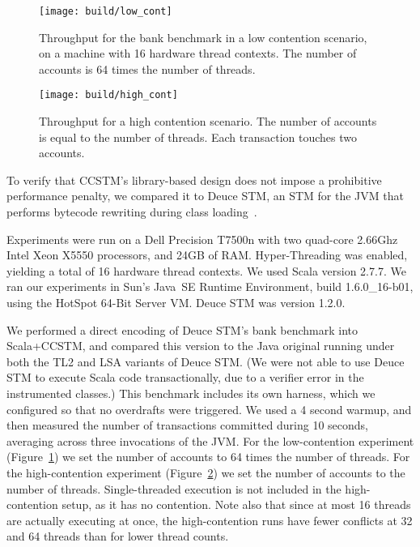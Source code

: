 
\begin{figure}
  \centering \texttt{[image: build/low\_cont]}

\caption{Throughput for the bank benchmark in a low contention scenario,
on a machine with 16 hardware thread contexts.  The number of accounts
is 64 times the number of threads.}

  \label{fig:lowcont}
\end{figure}

\begin{figure}
  \centering \texttt{[image: build/high\_cont]}

\caption{Throughput for a high contention scenario.  The number of accounts is
equal to the number of threads.  Each transaction touches two accounts.}

  \label{fig:highcont}
\end{figure}

To verify that CCSTM's library-based design does not impose a prohibitive
performance penalty, we compared it to Deuce STM, an STM for the JVM that
performs bytecode rewriting during class loading~\cite{deucestm}.

Experiments were run on a Dell Precision T7500n with two quad-core
2.66Ghz Intel Xeon X5550 processors, and 24GB of RAM.  Hyper-Threading was
enabled, yielding a total of 16 hardware thread contexts.  We used Scala
version 2.7.7.  We ran our experiments in
Sun's Java~SE Runtime Environment, build 1.6.0\_16-b01, using the HotSpot
64-Bit Server VM.  Deuce STM was version 1.2.0.

We performed a direct encoding of Deuce STM's bank benchmark into
Scala+CCSTM, and compared this version to the Java original running under
both the TL2 and LSA variants of Deuce STM.  (We were not able to use
Deuce STM to execute Scala code transactionally, due to a verifier error
in the instrumented classes.)  This benchmark includes its own harness,
which we configured so that no overdrafts were triggered.  We used a
4 second warmup, and then measured the number of transactions committed
during 10 seconds, averaging across three invocations of the JVM.  For the
low-contention experiment (Figure~\ref{fig:lowcont}) we set the number
of accounts to 64 times the number of threads.  For the high-contention
experiment (Figure~\ref{fig:highcont}) we set the number of accounts to
the number of threads.  Single-threaded execution is not included in the
high-contention setup, as it has no contention.  Note also that since at most
16 threads are actually executing at once, the high-contention runs have
fewer conflicts at 32 and 64 threads than for lower thread counts.

